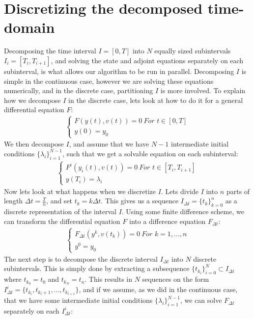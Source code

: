 \section{Discretizing the decomposed time-domain}
Decomposing the time interval $I=[0,T]$ into $N$ equally sized subintervals $I_i=[T_i,T_{i+1}]$, and solving the state and adjoint equations separately on each subinterval, is what allows our algorithm to be run in parallel. Decomposing $I$ is simple in the continuous case, however we are solving these equations numerically, and in the discrete case, partitioning $I$ is more involved. To explain how we decompose $I$ in the discrete case, lets look at how to do it for a general differential equation $F$:
\begin{align*}
\left\{
     \begin{array}{lr}
		F(y(t),v(t))=0 \	\textit{For $t \in [0,T]$} \\
		y(0)=y_0
	\end{array}
   \right.	
\end{align*} 
We then decompose $I$, and assume that we have $N-1$ intermediate initial conditions $\{\lambda_i\}_{i=1}^{N-1}$, such that we get a solvable equation on each subinterval:
\begin{align*}
\left\{
     \begin{array}{lr}
		F^i(y_i(t),v(t))=0 \	\textit{For $t \in [T_i,T_{i+1}]$} \\
		y(T_i)=\lambda_i
	\end{array}
   \right.	
\end{align*} 
Now lets look at what happens when we discretize $I$. Lets divide $I$ into $n$ parts of length $\Delta t=\frac{T}{n}$, and set $t_k=k\Delta t$. This gives us a sequence $I_{\Delta t}=\{t_k\}_{k=0}^{n}$ as a discrete representation of the interval $I$. Using some finite difference scheme, we can transform the differential equation $F$ into a difference equation $F_{\Delta t}$:
    \begin{align*}
\left\{
     \begin{array}{lr}
		F_{\Delta t}(y^k,v(t_k))=0 \	\textit{For $k=1,...,n$} \\
		y^0=y_0
	\end{array}
   \right.	
\end{align*} 
The next step is to decompose the discrete interval $I_{\Delta t}$ into $N$ discrete subintervals. This is simply done by extracting a subsequence $\{t_{k_i}\}_{i=0}^N\subset I_{\Delta t}$ where $t_{k_0}=t_0$ and $t_{k_N}=t_n$. This results in $N$ sequences on the form $I_{\Delta t}^i=\{t_{k_i},t_{k_i+1},...,t_{k_{i+1}}\}$, and if we assume, as we did in the continuous case, that we have some intermediate initial conditions $\{\lambda_i\}_{i=1}^{N-1}$, we can solve $F_{\Delta t}$ separately on each $I_{\Delta t}^i$: 
